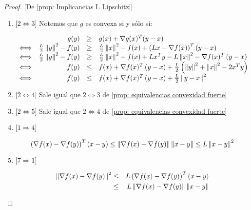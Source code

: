\begin{proof}{[De \ref{prop: Implicancias L Lipschitz}]}
	\begin{enumerate}
		\item {[$2 \Longleftrightarrow 3$]} Notemos que $g$ es convexa si y s\'olo si:
		
		\begin{equation*}
		\begin{array}{lrcl}
		& g(y) & \geq & g(x) + \nabla g(x) ^T (y-x) \\
		\Longleftrightarrow & \frac{L}{2}\left\lVert y\right\rVert^2 -  f(y)  & \geq & \frac{L}{2}\left\lVert x\right\rVert^2 -  f(x) + \left(Lx - \nabla f(x)\right)^T \left(y-x\right) \\
		\Longleftrightarrow & \frac{L}{2}\left\lVert y\right\rVert^2 -  f(y)  & \geq & \frac{L}{2}\left\lVert x\right\rVert^2 -  f(x) + Lx^Ty - L\left\lVert x\right\rVert^2 - \nabla f(x)^T \left(y-x\right) \\
		\Longleftrightarrow &f(y)   & \leq & f(x) + \nabla f(x)^T \left(y-x\right) + \frac{L}{2}\left(\left\lVert y\right\rVert^2 + \left\lVert x\right\rVert^2 -2 x^Ty\right)\\
		\Longleftrightarrow &f(y)   & \leq & f(x) + \nabla f(x)^T \left(y-x\right) + \frac{L}{2}\left\lVert y-x\right\rVert^2\\
		\end{array}
		\end{equation*}
		
		\item {[$2 \Longleftrightarrow 4$]} Sale igual que $2 \Longleftrightarrow 3$ de \ref{prop: equivalencias convexidad fuerte}
		
		\item {[$2 \Longleftrightarrow 5$]} Sale igual que $2 \Longleftrightarrow 4$ de \ref{prop: equivalencias convexidad fuerte}
		
		\item {[$1 \Longrightarrow 4$]} 
		
		\begin{equation*}
		\left(\nabla f(x) - \nabla f(y)\right)^T \left(x-y\right) \leq \left\lVert\nabla f(x) - \nabla f(y)\right\rVert\left\lVert x-y\right\rVert \leq L \left\lVert x-y\right\rVert^2 
		\end{equation*}
		
		\item {[$7 \Longrightarrow 1$]} 
		
		\begin{equation*}
		\begin{aligned}
		\left\lVert\nabla f(x) - \nabla f(y)\right\rVert^2 & \leq & L \left(\nabla f(x) - \nabla f(y)\right)^T \left(x-y\right) \\ & \leq & L\left\lVert\nabla f(x) - \nabla f(y)\right\rVert\left\lVert x-y\right\rVert
		\end{aligned}
		\end{equation*} 
		

\end{enumerate}
\end{proof}
